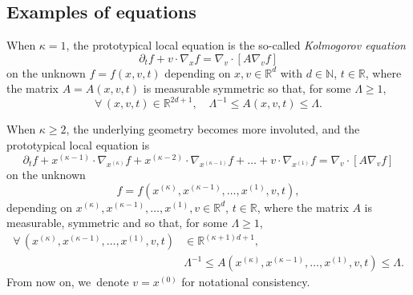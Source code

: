 \documentclass[10pt]{amsart}
\theoremstyle{definition}
\newcommand\N{{\mathbb N}}
\newcommand\R{{\mathbb R}}
\begin{document}
\subsection{Examples of equations}

When $\kappa=1$, the prototypical local equation is the so-called
\emph{Kolmogorov equation}
\begin{equation}
\label{eq:kolmo}
\partial_t f + v \cdot \nabla_x f = \nabla_v \cdot \left[ A
\nabla_v f \right]
\end{equation}
on the unknown $f=f(x,v,t)$ depending on $x,v \in \R^d$ with
$d \in \N$, $t \in \R$, where the matrix $A=A(x,v,t)$ is
measurable symmetric so that, for some $\Lambda \ge 1$,
\begin{equation}
\label{eq:ellip-1}
\forall \, (x,v,t) \in \R^{2d+1}, \quad \Lambda^{-1} \le
A(x,v,t) \le \Lambda.
\end{equation}

When $\kappa \ge 2$, the underlying geometry becomes more involuted, and
the prototypical local equation is
\begin{equation}
\label{eq:kolmo-k}
\partial_t f + x^{(\kappa-1)} \cdot \nabla_{x^{(\kappa)}} f
+ x^{(\kappa-2)} \cdot \nabla_{x^{(\kappa-1)}} f +
\dots + v \cdot \nabla_{x^{(1)}} f =
\nabla_v \cdot \left[ A \nabla_v f \right]
\end{equation}
on the unknown
\[
f=f(x^{(\kappa)},x^{(\kappa-1)}, \dots, x^{(1)},v,t),
\]
depending
on $x^{(\kappa)},x^{(\kappa-1)}, \dots, x^{(1)},v \in \R^d$,
$t \in \R$, where the matrix $A$ is measurable, symmetric and so
that, for some $\Lambda \ge 1$,
\begin{equation} \label{eq:ellip-k}
\begin{aligned}
\forall \, (x^{(\kappa)},x^{(\kappa-1)}, \dots, x^{(1)},v,t)
& \in \R^{(\kappa+1)d+1}, \\
&\Lambda^{-1} \le
A(x^{(\kappa)},x^{(\kappa-1)},\dots,x^{(1)},v,t) \le \Lambda.
\end{aligned}
\end{equation}
From now on, we~denote $v = x^{(0)}$ for notational consistency.
\end{document}
